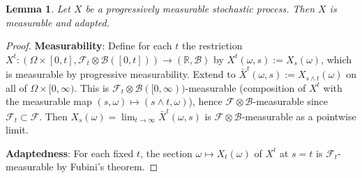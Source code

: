 \documentclass[a4paper,11pt]{book}
\newtheorem{lemma}[theorem]{Lemma}
\theoremstyle{definition}
\theoremstyle{remark}
\begin{document}
\begin{lemma}
	Let $X$ be a progressively measurable stochastic process. Then $X$ is measurable and adapted.
\end{lemma}
\begin{proof}
	\textbf{Measurability}: Define for each $t$ the restriction $X^t: (\Omega \times [0,t], \mathcal{F}_t \otimes \mathcal{B}([0,t])) \to (\mathbb{R}, \mathcal{B})$ by $X^t(\omega, s) := X_s(\omega)$, which is measurable by progressive measurability. Extend to $\bar{X}^t(\omega, s) := X_{s \wedge t}(\omega)$ on all of $\Omega \times [0,\infty)$. This is $\mathcal{F}_t \otimes \mathcal{B}([0,\infty))$-measurable (composition of $X^t$ with the measurable map $(s, \omega) \mapsto (s \wedge t, \omega)$), hence $\mathcal{F} \otimes \mathcal{B}$-measurable since $\mathcal{F}_t \subset \mathcal{F}$. Then $X_s(\omega) = \lim_{t \to \infty} \bar{X}^t(\omega, s)$ is $\mathcal{F} \otimes \mathcal{B}$-measurable as a pointwise limit.

	\textbf{Adaptedness}: For each fixed $t$, the section $\omega \mapsto X_t(\omega)$ of $X^t$ at $s = t$ is $\mathcal{F}_t$-measurable by Fubini's theorem.
\end{proof}
\end{document}
